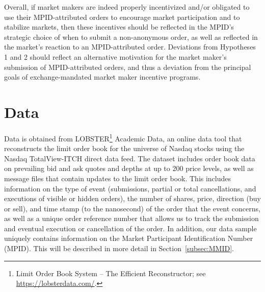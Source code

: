 \documentclass{article}
\begin{document}
\noindent Overall, if market makers are indeed properly incentivized and/or obligated to use their MPID-attributed orders to encourage market participation and to stabilize markets, then these incentives should be reflected in the MPID's strategic choice of when to submit a non-anonymous order, as well as reflected in the market's reaction to an MPID-attributed order. Deviations from Hypotheses 1 and 2 should reflect an alternative motivation for the market maker's submission of MPID-attributed orders, and thus a deviation from the principal goals of exchange-mandated market maker incentive programs.

\section{Data}\label{data}

Data is obtained from LOBSTER\footnote{Limit Order Book System -- The Efficient Reconstructor; see \url{https://lobsterdata.com/}.} Academic Data, an online data tool that reconstructs the limit order book for the universe of Nasdaq stocks using the Nasdaq TotalView-ITCH direct data feed. The dataset includes order book data on prevailing bid and ask quotes and depths at up to 200 price levels, as well as message files that contain updates to the limit order book. This includes information on the type of event (submissions, partial or total cancellations, and executions of visible or hidden orders), the number of shares, price, direction (buy or sell), and time stamp (to the nanosecond) of the order that the event concerns, as well as a unique order reference number that allows us to track the submission and eventual execution or cancellation of the order. In addition, our data sample uniquely contains information on the Market Participant Identification Number (MPID). This will be described in more detail in Section~\ref{subsec:MMID}.
\end{document}
